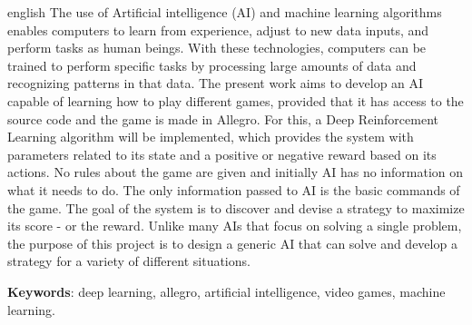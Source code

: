 \begin{resumo}[Abstract]
 \begin{otherlanguage*}{english}
	The use of Artificial intelligence (AI) and machine learning algorithms enables computers to learn from experience, adjust to new data inputs, and perform tasks as human beings. With these technologies, computers can be trained to perform specific tasks by processing large amounts of data and recognizing patterns in that data.
	The present work aims to develop an AI capable of learning how to play different games, provided that it has access to the source code and the game is made in Allegro. For this, a Deep Reinforcement Learning algorithm will be implemented, which provides the system with parameters related to its state and a positive or negative reward based on its actions. No rules about the game are given and initially AI has no information on what it needs to do. The only information passed to AI is the basic commands of the game. The goal of the system is to discover and devise a strategy to maximize its score - or the reward. Unlike many AIs that focus on solving a single problem, the purpose of this project is to design a generic AI that can solve and develop a strategy for a variety of different situations.

   	\vspace{\onelineskip}

   	\noindent 
   	\textbf{Keywords}: deep learning, allegro, artificial intelligence, video games, machine learning.
 \end{otherlanguage*}
\end{resumo}

 

  
